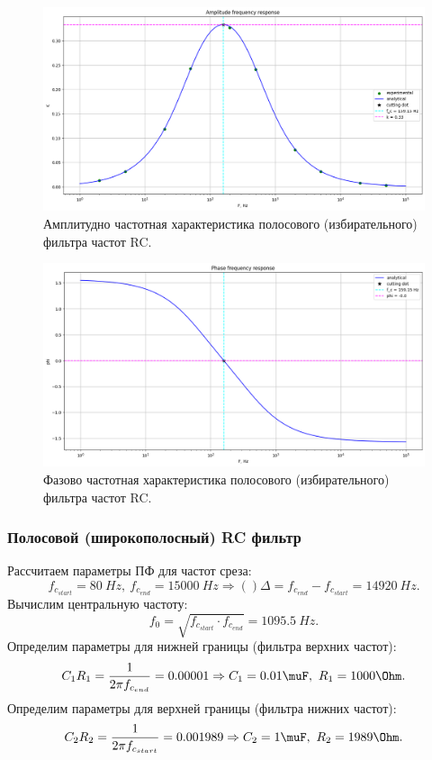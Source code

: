 \documentclass[12pt]{article}
\begin{document}
\begin{figure}[H]
    \centering
    \includegraphics[width=\textwidth]{3_afr.png}
    \caption{Амплитудно частотная характеристика полосового (избирательного) фильтра частот RC.}
    \label{fig:3_afr}
\end{figure}

\begin{figure}[H]
    \centering
    \includegraphics[width=\textwidth]{3_pfr.png}
    \caption{Фазово частотная характеристика полосового (избирательного) фильтра частот RC.}
    \label{fig:3_pfr}
\end{figure}

\subsubsection*{Полосовой (широкополосный) RC фильтр}

Рассчитаем параметры ПФ для частот среза:
\[
    f_{c_{start}} = 80 \ Hz, \ f_{c_{end}} = 15000 \ Hz \Rightarrow() \Delta = f_{c_{end}} - f_{c_{start}} = 14920 \ Hz.
\]
Вычислим центральную частоту:
\[
    f_0 = \sqrt{f_{c_{start}} \cdot f_{c_{end}}} = 1095.5 \ Hz.
\]
Определим параметры для нижней границы (фильтра верхних частот):
\[
    C_1 R_1 = \frac{1}{2 \pi f_{c_{end}}} = 0.00001 \Rightarrow C_1 = 0.01 \muF, \ R_1 = 1000 \Ohm.
\]
Определим параметры для верхней границы (фильтра нижних частот):
\[
    C_2 R_2 = \frac{1}{2 \pi f_{c_{start}}} = 0.001989 \Rightarrow C_2 = 1 \muF, \ R_2 = 1989 \Ohm.
\]
\end{document}
